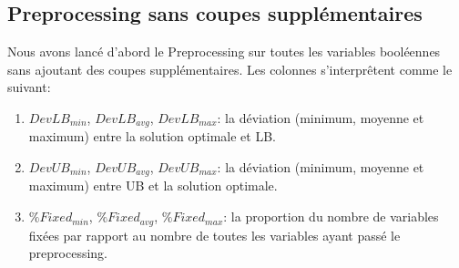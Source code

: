 \documentclass[twoside,fleqn]{EPURapport}
\begin{document}
\subsection{Preprocessing sans coupes supplémentaires}
Nous avons lancé d'abord le Preprocessing sur toutes les variables booléennes sans ajoutant des coupes supplémentaires.
Les colonnes s'interprêtent comme le suivant:
\begin{enumerate}
	\item $DevLB_{min}$, $DevLB_{avg}$, $DevLB_{max}$: la déviation (minimum, moyenne et maximum) entre la solution optimale et LB.
	\item $DevUB_{min}$, $DevUB_{avg}$, $DevUB_{max}$: la déviation (minimum, moyenne et maximum) entre UB et la solution optimale.
	\item $\%Fixed_{min}$, $\%Fixed_{avg}$, $\%Fixed_{max}$: la proportion du nombre de variables fixées par rapport au nombre de toutes les variables ayant passé le preprocessing.
\end{enumerate}

\end{document}

